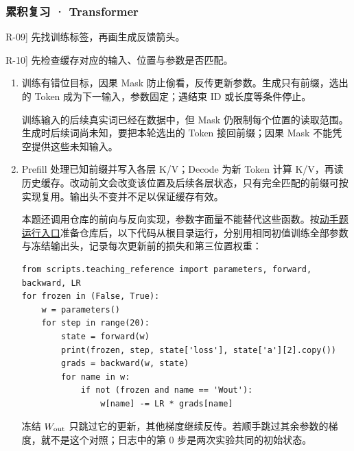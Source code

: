 \subsubsection*{累积复习 · Transformer}
\begin{answerhints}
\item[\hyperref[exercise:review-training-generation]{R-09}] \leavevmode{}\label{hint:review-training-generation}先找训练标签，再画生成反馈箭头。
\item[\hyperref[exercise:review-cache-output-head]{R-10}] \leavevmode{}\label{hint:review-cache-output-head}先检查缓存对应的输入、位置与参数是否匹配。
\end{answerhints}
\begin{enumerate}[label={},leftmargin=4.8em,itemsep=4pt]
\item[\textbf{\hyperref[exercise:review-training-generation]{R-09.}}] \leavevmode{}\label{solution:R-09}\label{solution:review-training-generation}训练有错位目标，因果 Mask 防止偷看，反传更新参数。生成只有前缀，选出的 Token 成为下一输入，参数固定；遇结束 ID 或长度等条件停止。\par 训练输入的后续真实词已经在数据中，但 Mask 仍限制每个位置的读取范围。生成时后续词尚未知，要把本轮选出的 Token 接回前缀；因果 Mask 不能凭空提供这些未知输入。
\item[\textbf{\hyperref[exercise:review-cache-output-head]{R-10.}}] \leavevmode{}\label{solution:R-10}\label{solution:review-cache-output-head}Prefill 处理已知前缀并写入各层 K/V；Decode 为新 Token 计算 K/V，再读历史缓存。改动前文会改变该位置及后续各层状态，只有完全匹配的前缀可按实现复用。输出头不变并不足以保证缓存有效。\par{}本题还调用仓库的前向与反向实现，参数字面量不能替代这些函数。按\hyperref[app:exercise-runtime]{动手题运行入口}准备仓库后，以下代码从根目录运行，分别用相同初值训练全部参数与冻结输出头，记录每次更新前的损失和第三位置权重：\par\nobreak
\begin{samepage}\begin{verbatim}
from scripts.teaching_reference import parameters, forward, backward, LR
for frozen in (False, True):
    w = parameters()
    for step in range(20):
        state = forward(w)
        print(frozen, step, state['loss'], state['a'][2].copy())
        grads = backward(w, state)
        for name in w:
            if not (frozen and name == 'Wout'):
                w[name] -= LR * grads[name]
\end{verbatim}\end{samepage}
冻结 $W_{\rm out}$ 只跳过它的更新，其他梯度继续反传。若顺手跳过其余参数的梯度，就不是这个对照；日志中的第 $0$ 步是两次实验共同的初始状态。
\end{enumerate}
